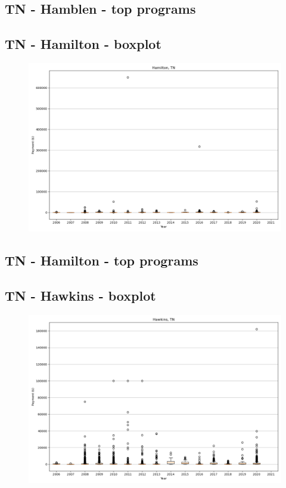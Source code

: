 \subsection*{TN - Hamblen - top programs}

\newpage
\subsection*{TN - Hamilton - boxplot}
\begin{figure}[h]
\centering
\includegraphics[width=7in]{../output/boxplots/counties/Hamilton-TN_boxplot.png}
\end{figure}


\subsection*{TN - Hamilton - top programs}

\newpage
\subsection*{TN - Hawkins - boxplot}
\begin{figure}[h]
\centering
\includegraphics[width=7in]{../output/boxplots/counties/Hawkins-TN_boxplot.png}
\end{figure}


